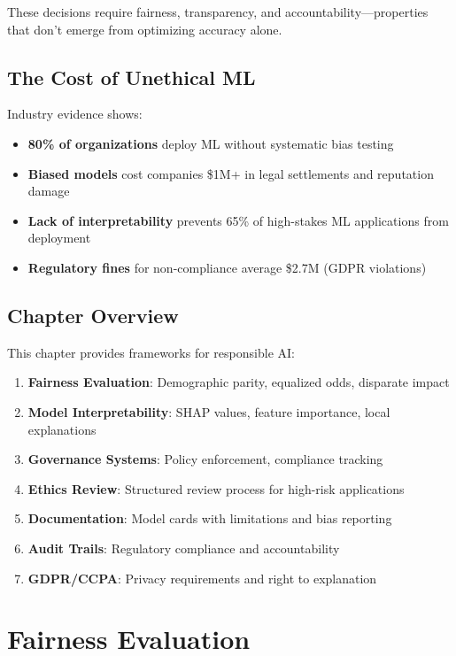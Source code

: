 These decisions require fairness, transparency, and accountability---properties that don't emerge from optimizing accuracy alone.

\subsection{The Cost of Unethical ML}

Industry evidence shows:
\begin{itemize}
    \item \textbf{80\% of organizations} deploy ML without systematic bias testing
    \item \textbf{Biased models} cost companies \$1M+ in legal settlements and reputation damage
    \item \textbf{Lack of interpretability} prevents 65\% of high-stakes ML applications from deployment
    \item \textbf{Regulatory fines} for non-compliance average \$2.7M (GDPR violations)
\end{itemize}

\subsection{Chapter Overview}

This chapter provides frameworks for responsible AI:

\begin{enumerate}
    \item \textbf{Fairness Evaluation}: Demographic parity, equalized odds, disparate impact
    \item \textbf{Model Interpretability}: SHAP values, feature importance, local explanations
    \item \textbf{Governance Systems}: Policy enforcement, compliance tracking
    \item \textbf{Ethics Review}: Structured review process for high-risk applications
    \item \textbf{Documentation}: Model cards with limitations and bias reporting
    \item \textbf{Audit Trails}: Regulatory compliance and accountability
    \item \textbf{GDPR/CCPA}: Privacy requirements and right to explanation
\end{enumerate}

\section{Fairness Evaluation}

